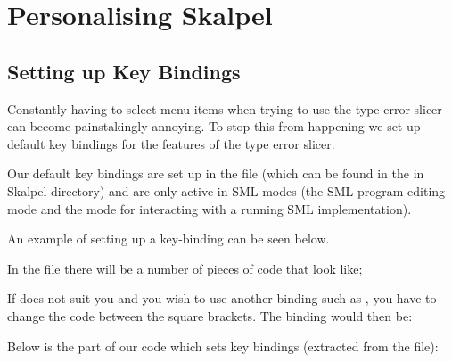 \documentclass{article}
\begin{document}
\section{Personalising Skalpel}


\subsection{Setting up Key Bindings}
\label{sec:setting-key-bindings}

Constantly having to select menu items when trying to use the type
error slicer can become painstakingly annoying.  To stop this from
happening we set up default key bindings for the features of the type
error slicer.


Our default key bindings are set up in the file
 (which can be found in the
 in Skalpel directory) and are only
active in SML modes (the SML program editing mode and the mode for
interacting with a running SML implementation).


\medskip
An example of setting up a key-binding can be seen below.

In the file  there will be a number of
pieces of code that look like;

If  does not suit you and you wish to use another
binding such as , you have to change the
code between the square brackets.  The binding would then be:


\medskip
Below is the part of our code which sets key bindings (extracted from
the  file):
\end{document}
